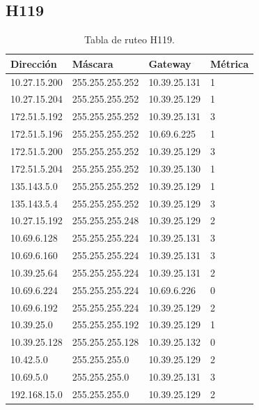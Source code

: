 \documentclass[12pt,titlepage]{article}
\begin{document}
\subsection{H119}
\begin{table}
  \begin{center}
    \begin{tabular}{|l|l|l|l|}
      \hline
        \bf{Direcci\'on} & \bf{M\'ascara} & \bf{Gateway} & \bf{M\'etrica} \\
      \hline 
	10.27.15.200  & 255.255.255.252 & 10.39.25.131 & 1 \\
        10.27.15.204  & 255.255.255.252 & 10.39.25.129 & 1 \\
        172.51.5.192  & 255.255.255.252 & 10.39.25.131 & 3 \\
        172.51.5.196  & 255.255.255.252 & 10.69.6.225 & 1 \\
        172.51.5.200  & 255.255.255.252 & 10.39.25.129 & 3 \\
        172.51.5.204  & 255.255.255.252 & 10.39.25.130 & 1 \\
        135.143.5.0   & 255.255.255.252 & 10.39.25.129 & 1 \\
        135.143.5.4   & 255.255.255.252 & 10.39.25.129 & 3 \\ 	
	10.27.15.192  & 255.255.255.248 & 10.39.25.129 & 2 \\
	10.69.6.128   & 255.255.255.224 & 10.39.25.131 & 3 \\
        10.69.6.160   & 255.255.255.224 & 10.39.25.131 & 3 \\
	10.39.25.64   & 255.255.255.224 & 10.39.25.131 & 2 \\       
	10.69.6.224   & 255.255.255.224 & 10.69.6.226 & 0 \\
	10.69.6.192   & 255.255.255.224 & 10.39.25.129 & 2 \\	
	10.39.25.0    & 255.255.255.192 & 10.39.25.129 & 1 \\
	10.39.25.128  & 255.255.255.128 & 10.39.25.132 & 0 \\
	10.42.5.0     & 255.255.255.0 & 10.39.25.129 & 2 \\
        10.69.5.0     & 255.255.255.0 & 10.39.25.131 & 3 \\
        192.168.15.0  & 255.255.255.0 & 10.39.25.129 & 2 \\  
    \hline
    \end{tabular} \\
  \end{center}
  \caption{Tabla de ruteo H119.}
\end{table}
\newpage
\end{document}
